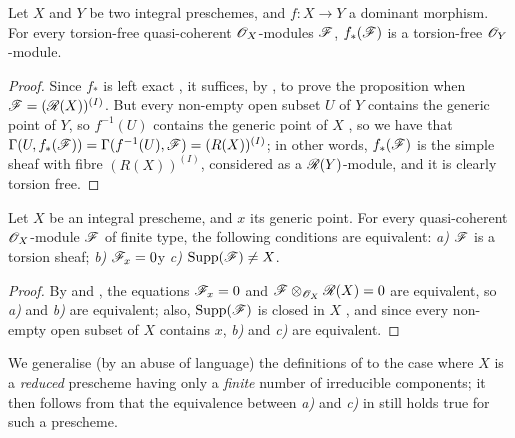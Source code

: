 \begin{prop}[7.4.5]
\label{1.7.4.5}
Let $X$ and $Y$ be two integral preschemes, and $f\colon X\to Y$ a dominant morphism.
For every torsion-free quasi-coherent $\mathscr{O}_X$-modules $\mathscr{F}$, $f_*(\mathscr{F})$ is a torsion-free $\mathscr{O}_Y$-module.
\end{prop}

\begin{proof}
\label{proof-1.7.4.5}
Since $f_*$ is left exact , it suffices, by , to prove the proposition when $\mathscr{F}=(\mathscr{R}(X))^{(I)}$.
But every non-empty open subset $U$ of $Y$ contains the generic point of $Y$, so $f^{-1}(U)$ contains the generic point of $X$ , so we have that $\Gamma(U,f_*(\mathscr{F})) = \Gamma(f^{-1}(U),\mathscr{F}) = (R(X))^{(I)}$; in other words, $f_*(\mathscr{F})$ is the simple sheaf with fibre $(R(X))^{(I)}$, considered as a $\mathscr{R}(Y)$-module, and it is clearly torsion free.
\end{proof}

\begin{prop}[7.4.6]
\label{1.7.4.6}
Let $X$ be an integral prescheme, and $x$ its generic point.
For every quasi-coherent $\mathscr{O}_X$-module $\mathscr{F}$ of finite type, the following conditions are equivalent: \emph{a)} $\mathscr{F}$ is a torsion sheaf; \emph{b)} $\mathscr{F}_x=0$y \emph{c)} ${\mathop{\mathrm{Supp}}\nolimits}(\mathscr{F})\neq X$.
\end{prop}

\begin{proof}
\label{proof-1.7.4.6}
By  and , the equations $\mathscr{F}_x=0$ and $\mathscr{F}\otimes_{\mathscr{O}_X}\mathscr{R}(X)=0$ are equivalent, so \emph{a)} and \emph{b)} are equivalent; also, ${\mathop{\mathrm{Supp}}\nolimits}(\mathscr{F})$ is closed in $X$ , and since every non-empty open subset of $X$ contains $x$, \emph{b)} and \emph{c)} are equivalent.
\end{proof}

\begin{env}[7.4.7]
\label{1.7.4.7}
We generalise (by an abuse of language) the definitions of  to the case where $X$ is a \emph{reduced} prescheme having only a \emph{finite} number of irreducible components; it then follows from  that the equivalence between \emph{a)} and \emph{c)} in  still holds true for such a prescheme.
\end{env}
